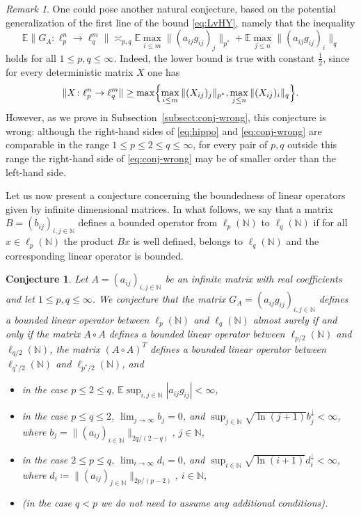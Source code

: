 \documentclass[a4paper]{amsart}
\newtheorem{conjecture}{Conjecture}[] %
\theoremstyle{definition}
\theoremstyle{remark}
\newtheorem{remark}[theorem]{Remark}
\numberwithin{equation}{section}
\newcommand*{\NN}{\mathbb{N}}
\newcommand*{\EE}{\mathbb{E}}
\newcommand*{\rearr}{\downarrow} %
\begin{document}
\begin{remark}\label{rmk:conj-wrong}
	One could pose another natural conjecture, based on the potential generalization of the first line of the bound \eqref{eq:LvHY},
	 namely that  the inequality
	\begin{equation}\label{eq:conj-wrong}
		\EE \|G_A\colon \ell_{p}^n\to\ell_q^m\|
		\asymp_{p,q} 
		\EE\max_{i\le m} \| (a_{ij}g_{ij})_j\|_{p^\ast} +\EE\max_{j\le n}  \| (a_{ij}g_{ij})_i\|_q 
	\end{equation}
	holds for all $1\le p,q \le \infty$.
	Indeed, the lower bound is true with constant $\frac 12$, since  for every deterministic matrix $X$ one has
	\[
		 \|X\colon \ell_{p}^n\to\ell_q^m\| \ge \max\Bigl\{\max_{i\le m} \| (X_{ij})_j\|_{p^\ast} ,\max_{j\le n}  \| (X_{ij})_i\|_q \Bigr\}.
	\]
	However, as we prove in Subsection~\ref{subsect:conj-wrong}, this conjecture is wrong: although the right-hand sides of \eqref{eq:hippo} and \eqref{eq:conj-wrong} are comparable  in the range $1\le p \le 2\le q\le \infty$, for every pair of $p,q$ outside this range the right-hand side of \eqref{eq:conj-wrong} may be of smaller order than the left-hand side.
\end{remark}


Let us now present a conjecture concerning the boundedness of linear operators given by infinite dimensional matrices. 
In what follows, we say that a matrix $B= (b_{ij})_{i,j\in \NN}$ defines a bounded operator from $\ell_p(\NN)$ to $\ell_q(\NN)$ if for all $x \in \ell_p(\NN)$ the product $B x$ is well defined, belongs to $\ell_q(\NN)$ and the corresponding linear operator is bounded.

\begin{conjecture}\label{conj:conjecture_infty}
Let $A = (a_{ij})_{i,j\in \NN}$ be an infinite matrix with real coefficients and let $1\le p, q \le \infty$.
We conjecture that the matrix $G_A = (a_{ij}g_{ij})_{i,j\in \NN}$  defines a bounded linear operator between $\ell_p(\NN)$ and $\ell_q(\NN)$ almost surely if and only if the matrix $A\circ A$ defines a bounded linear operator between $\ell_{p/2}(\NN)$ and $\ell_{q/2}(\NN)$, the matrix $(A\circ A)^T$ defines a bounded linear operator between $\ell_{q^\ast/2}(\NN)$ and $\ell_{p^\ast/2}(\NN)$, and 
\begin{itemize}
	\item in the case $p\leq 2\leq q$,  $\EE \sup_{i,j\in\NN} |a_{ij}g_{ij}|<\infty$,
	\item in the case $p\leq q\leq 2$, $\lim_{j\to \infty} b_j = 0$,
and $\sup_{j\in \NN}\sqrt{\ln(j+1)} b_j^{\rearr{}} <\infty$, where 
$b_j =  \|(a_{ij})_{i\in \NN}\|_{2q/(2-q)}$, $j\in\NN$,
	\item in the case $2\leq p \leq q$, $\lim_{i\to \infty} d_i = 0$, and $\sup_{i\in \NN}\sqrt{\ln (i+1)} d_i^{\rearr{}} <\infty$, where $d_i \coloneqq \|(a_{ij})_{j\in \NN} \|_{2p/(p-2)}$, $i\in\NN$,
	\item (in the case $q<p$ we do not need to assume any additional conditions).
\end{itemize}
\end{conjecture}
\end{document}
